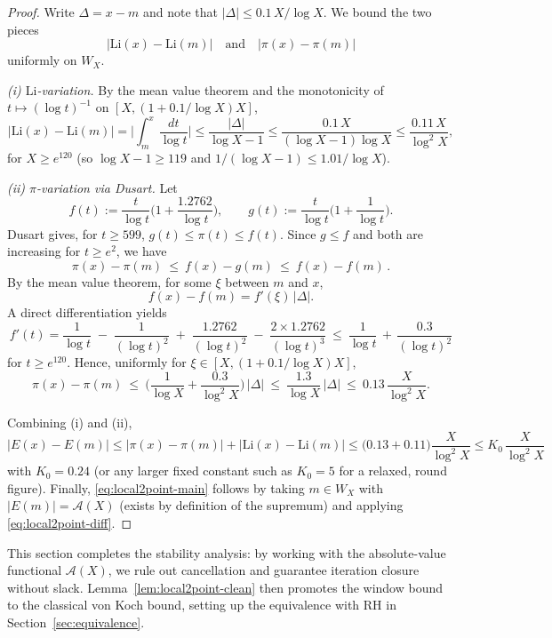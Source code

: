 \documentclass[11pt]{article}
\theoremstyle{plain}
\theoremstyle{definition}
\theoremstyle{remark}
\begin{document}
\begin{proof}
Write $\Delta=x-m$ and note that $|\Delta|\le 0.1\,X/\log X$. We bound the two pieces
\[
|\mathrm{Li}(x)-\mathrm{Li}(m)|\quad\text{and}\quad |\pi(x)-\pi(m)|
\]
uniformly on $W_X$.

\smallskip\noindent\emph{(i) $\mathrm{Li}$-variation.}
By the mean value theorem and the monotonicity of $t\mapsto (\log t)^{-1}$ on $[X,(1+0.1/\log X)X]$,
\[
|\mathrm{Li}(x)-\mathrm{Li}(m)|
= \Big|\int_m^x \frac{dt}{\log t}\Big|
\le \frac{|\Delta|}{\log X -1}
\le \frac{0.1\,X}{(\log X-1)\log X}
\le \frac{0.11\,X}{\log^2 X},
\]
for $X\ge e^{120}$ (so $\log X-1\ge 119$ and $1/(\log X-1)\le 1.01/\log X$).

\smallskip\noindent\emph{(ii) $\pi$-variation via Dusart.}
Let
\[
f(t):=\frac{t}{\log t}\Big(1+\frac{1.2762}{\log t}\Big),\qquad
g(t):=\frac{t}{\log t}\Big(1+\frac{1}{\log t}\Big).
\]
Dusart \cite[Thm.~1.10]{Dusart2010} gives, for $t\ge 599$,
\(
g(t)\le \pi(t)\le f(t).
\)
Since $g\le f$ and both are increasing for $t\ge e^2$, we have
\[
\pi(x)-\pi(m)\ \le\ f(x)-g(m)\ \le\ f(x)-f(m)\,.
\]
By the mean value theorem, for some $\xi$ between $m$ and $x$,
\[
f(x)-f(m)=f'(\xi)\,|\Delta|.
\]
A direct differentiation yields
\[
f'(t)=\frac{1}{\log t}\;-\;\frac{1}{(\log t)^2}
\;+\;\frac{1.2762}{(\log t)^2}\;-\;\frac{2\times 1.2762}{(\log t)^3}
\ \le\ \frac{1}{\log t}\,+\,\frac{0.3}{(\log t)^2}
\]
for $t\ge e^{120}$. Hence, uniformly for $\xi\in [X,(1+0.1/\log X)X]$,
\[
\pi(x)-\pi(m)\ \le\ \Big(\frac{1}{\log X}+\frac{0.3}{\log^2 X}\Big)\,|\Delta|
\ \le\ \frac{1.3}{\log X}\,|\Delta|
\ \le\ 0.13\,\frac{X}{\log^2 X}.
\]

\smallskip
Combining (i) and (ii),
\[
|E(x)-E(m)| \le |\pi(x)-\pi(m)| + |\mathrm{Li}(x)-\mathrm{Li}(m)|
\le \Big(0.13+0.11\Big)\frac{X}{\log^2 X}
\le K_0\,\frac{X}{\log^2 X}
\]
with $K_0=0.24$ (or any larger fixed constant such as $K_0=5$ for a relaxed, round figure).
Finally, \eqref{eq:local2point-main} follows by taking $m\in W_X$ with
$|E(m)|=\mathcal A(X)$ (exists by definition of the supremum) and applying \eqref{eq:local2point-diff}.
\end{proof}

This section completes the stability analysis: by working with the absolute-value functional $\mathcal A(X)$, we rule out cancellation and guarantee iteration closure without slack. Lemma~\ref{lem:local2point-clean} then promotes the window bound to the classical von Koch bound, setting up the equivalence with RH in Section~\ref{sec:equivalence}.
\end{document}
